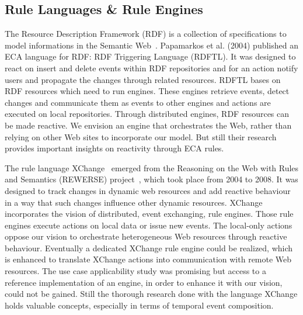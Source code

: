 \subsection{Rule Languages \& Rule Engines}
The Resource Description Framework (\textrm{RDF}) is a collection of specifications to model informations in the \textrm{Semantic Web}~\cite{berners2001semantic}.
Papamarkos et al. (2004) published an \textrm{ECA} language for \textrm{RDF}: \textrm{RDF Triggering Language} (\textrm{RDFTL}).
It was designed to react on insert and delete events within \textrm{RDF} repositories and for an action notify users and propagate the changes through related resources. %
\textrm{RDFTL} bases on \textrm{RDF} resources which need to run engines.
These engines retrieve events, detect changes and communicate them as events to other engines and actions are executed on local repositories.
Through distributed engines, \textrm{RDF} resources can be made reactive.
We envision an engine that orchestrates the Web, rather than relying on other Web sites to incorporate our model.
But still their research provides important insights on reactivity through \textrm{ECA} rules.

The rule language \textrm{XChange}~\cite{2005-Patranjan-TLE.pdf} emerged from the \textrm{Reasoning on the Web with Rules and Semantics} (\textrm{REWERSE}) project~\cite{wwwRewerse}, which took place from 2004 to 2008. 
It was designed to track changes in dynamic web resources and add reactive behaviour in a way that such changes influence other dynamic resources.
\textrm{XChange} incorporates the vision of distributed, event exchanging, rule engines.
Those rule engines execute actions on local data or issue new events.
The local-only actions oppose our vision to orchestrate heterogeneous Web resources through reactive behaviour.
Eventually a dedicated \textrm{XChange} rule engine could be realized, which is enhanced to translate \textrm{XChange} actions into communication with remote Web resources.
The use case applicability study was promising but access to a reference implementation of an engine, in order to enhance it with our vision, could not be gained. %
Still the thorough research done with the language \textrm{XChange} holds valuable concepts, especially in terms of temporal event composition.

